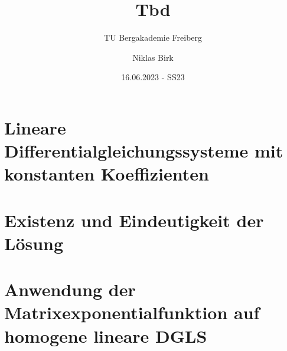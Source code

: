 \documentclass[11pt]{scrartcl}
\title{
    Tbd
}
\subtitle{TU Bergakademie Freiberg}
\author{Niklas Birk}
\date{16.06.2023 - SS23}
\begin{document}
    \maketitle
    \tableofcontents

    \printbibliography

    \newpage

    \section{Lineare Differentialgleichungssysteme mit konstanten Koeffizienten}\label{sec:01}
    

    \section{Existenz und Eindeutigkeit der Lösung}\label{sec:02}
    

    \section{Anwendung der Matrixexponentialfunktion auf homogene lineare DGLS}\label{sec:03}
    
\end{document}

